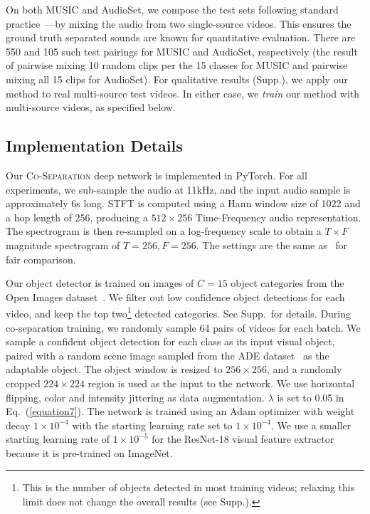 \documentclass[10pt,twocolumn,letterpaper]{article}
\begin{document}
On both MUSIC and AudioSet, we compose the test sets following standard practice~\cite{barzelay2007harmony,zhao2018sound,owens2018audio,gao2018objectSounds}---by mixing the audio from two single-source videos.  This ensures the ground truth separated sounds are known for quantitative evaluation. There are 550 and 105 such test pairings for MUSIC and AudioSet, respectively (the result of pairwise mixing 10 random clips per the 15 classes for MUSIC and pairwise mixing all 15 clips for AudioSet).  For qualitative results (Supp.), we apply our method to real multi-source test videos. In either case, we \emph{train} our method with multi-source videos, as specified below.

\subsection{Implementation Details}\label{exp:implementaiton}
Our \textsc{Co-Separation} deep network is implemented in PyTorch. For all experiments, we sub-sample the audio at 11kHz, and the input audio sample is approximately 6s long. STFT is computed using a Hann window size of 1022 and a hop length of 256, producing a $512 \times 256$ Time-Frequency audio representation. The spectrogram is then re-sampled on a log-frequency scale to obtain a $T \times F$ magnitude spectrogram of $T = 256, F = 256$. The settings are the same as~\cite{zhao2018sound} for fair comparison. 

Our object detector is trained on images of $C=15$ object categories from the Open Images dataset~\cite{OpenImages2}. We filter out low confidence object detections for each video, and keep the top two\footnote{This is the number of objects detected in most training videos; relaxing this limit does not change the overall results (see Supp.).} detected categories. See Supp.~for details. During co-separation training, we randomly sample 64 pairs of videos for each batch. We sample a confident object detection for each class as its input visual object, paired with a random scene image sampled from the ADE dataset~\cite{zhou2017scene} as the adaptable object. The object window is resized to $256 \times 256$, and a randomly cropped $224 \times 224$ region is used as the input to the network. We use horizontal flipping, color and intensity jittering as data augmentation. $\lambda$ is set to 0.05 in Eq.~(\ref{equation7}). The network is trained using an Adam optimizer with weight decay $1 \times 10^{-4}$ with the starting learning rate set to $1 \times 10^{-4}$. We use a smaller starting learning rate of $1 \times 10^{-5}$ for the ResNet-18 visual feature extractor because it is pre-trained on ImageNet.
\end{document}
